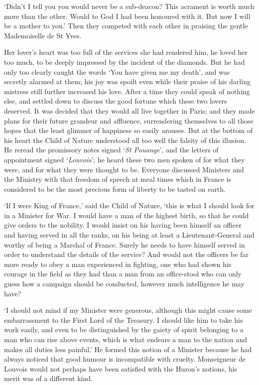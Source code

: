 \documentclass{article}
\begin{document}
\begin{center}
`Didn't I tell you you would never be a sub-deacon? This acrament is worth much 
more than the other. Would to God I had been honoured with it. But now I will be 
a mother to you.' Then they competed with each other in praising the gentle Mademoiselle 
de St Yves. 

Her lover's heart was too full of the services she had rendered him, he loved her 
too much, to be deeply impressed by the incident of the diamonds. But he had only 
too clearly caught the words `You have given me my death', and was secretly alarmed 
at them; his joy was spoilt even while their praise of his darling mistress still 
further increased his love. After a time they could speak of nothing else, and 
settled down to discuss the good fortune which these two lovers deserved. It was 
decided that they would all live together in Paris; and they made plans for their 
future grandeur and affluence, surrendering themselves to all those hopes that 
the least glimmer of happiness so easily arouses. But at the bottom of his heart 
the Child of Nature understood all too well the falsity of this illusion. He reread 
the promissory notes signed `\textit{St Pouange}', and the letters of appointment 
signed `\textit{Louvois}'; he heard these two men spoken of for what they were, 
and for what they were thought to be. Everyone discussed Ministers and the Ministry 
with that freedom of speech at meal times which in France is considered to be the 
most precious form of liberty to be tasted on earth. 

`If I were King of France,' said the Child of Nature, `this is what I should look 
for in a Minister for War. I would have a man of the highest birth, so that he 
could give orders to the nobility. I would insist on his having been himself an 
officer and having served in all the ranks, on his being at least a Lieutenant-General 
and worthy of being a Marshal of France. Surely he needs to have himself served 
in order to understand the details of the service? And would not the officers be 
far more ready to obey a man experienced in fighting, one who had shown his courage 
in the field as they had than a man from an office-stool who can only guess how 
a campaign should be conducted, however much intelligence he may have? 

`I should not mind if my Minister were generous, although this might cause some 
embarrassment to the First Lord of the Treasury. I should like him to take his 
work easily, and even to be distinguished by the gaiety of spirit belonging to 
a man who can rise above events, which is what endears a man to the nation and 
makes all duties less painful.' He formed this notion of a Minister because he 
had always noticed that good humour is incompatible with cruelty. Monseigneur de 
Louvois would not perhaps have been satisfied with the Huron's notions, his merit 
was of a different kind. 


\end{center}
\end{document}
